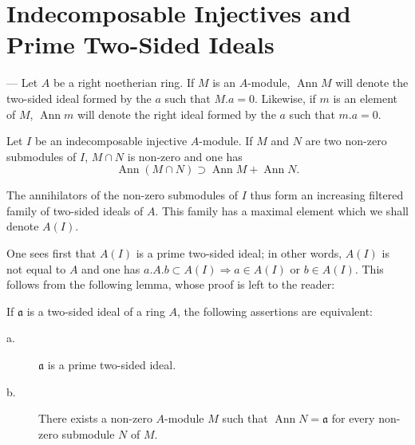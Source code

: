 %
%

\section{Indecomposable Injectives and Prime Two-Sided Ideals}

--- Let $A$ be a right noetherian ring. If $M$ is an $A$-module,
$\operatorname{Ann} M$ will denote the two-sided ideal formed by the
$a$ such that $M.a = 0$. Likewise, if $m$ is an element of $M$,
$\operatorname{Ann} m$ will denote the right ideal formed by the $a$
such that $m.a = 0$.

Let $I$ be an indecomposable injective $A$-module. If $M$ and $N$ are
two non-zero submodules of $I$, $M \cap N$ is non-zero and one has
\[
\operatorname{Ann}(M \cap N) \supset \operatorname{Ann} M + \operatorname{Ann} N.
\]

The annihilators of the non-zero submodules of $I$ thus form an
increasing filtered family of two-sided ideals of $A$. This family has
a maximal element which we shall denote $A(I)$.

One sees first that $A(I)$ is a prime two-sided ideal; in other words,
$A(I)$ is not equal to $A$ and one has
$a.A.b \subset A(I) \Rightarrow a \in A(I)$ or $b \in A(I)$. This follows
from the following lemma, whose proof is left to the reader:

\begin{lemma}
If $\mathfrak{a}$ is a two-sided ideal of a ring $A$, the following
assertions are equivalent:
\begin{description}
\item[\normalfont a.] $\mathfrak{a}$ is a prime two-sided ideal.
\item[\normalfont b.] There exists a non-zero $A$-module $M$ such that
  $\operatorname{Ann} N = \mathfrak{a}$ for every non-zero submodule
  $N$ of $M$.
\end{description}
\end{lemma}

